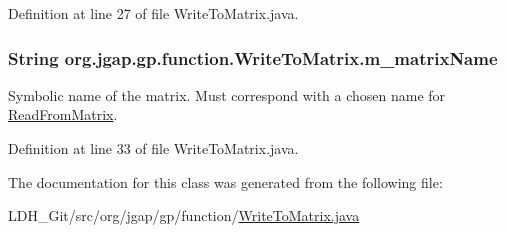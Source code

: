 Definition at line 27 of file Write\-To\-Matrix.\-java.

\hypertarget{classorg_1_1jgap_1_1gp_1_1function_1_1_write_to_matrix_a877557b49dc503786a4e440fb4df8991}{
\subsubsection[{m\-\_\-matrix\-Name}]{\setlength{\rightskip}{0pt plus 5cm}String org.\-jgap.\-gp.\-function.\-Write\-To\-Matrix.\-m\-\_\-matrix\-Name\hspace{0.3cm}{\ttfamily [private]}}}\label{classorg_1_1jgap_1_1gp_1_1function_1_1_write_to_matrix_a877557b49dc503786a4e440fb4df8991}
Symbolic name of the matrix. Must correspond with a chosen name for \hyperlink{classorg_1_1jgap_1_1gp_1_1function_1_1_read_from_matrix}{Read\-From\-Matrix}. 

Definition at line 33 of file Write\-To\-Matrix.\-java.



The documentation for this class was generated from the following file\-:\begin{DoxyCompactItemize}
\item 
L\-D\-H\-\_\-\-Git/src/org/jgap/gp/function/\hyperlink{_write_to_matrix_8java}{Write\-To\-Matrix.\-java}\end{DoxyCompactItemize}
